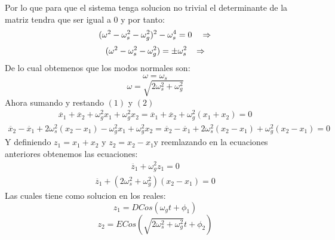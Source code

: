 \documentclass[a4paper]{article}
\begin{document}
\begin{answer}
\begin{enumerate}
    Por lo que para que el sistema tenga solucion no trivial el determinante de la matriz tendra que ser igual a $0$ y por tanto:
    $$(\omega^2 - \omega_s^2 -\omega_g^2)^2 - \omega_s^4 = 0 \hspace{0.35cm} \Rightarrow$$
    $$(\omega^2 - \omega_s^2 -\omega_g^2)  = \pm\omega_s^2  \hspace{0.3cm} \Rightarrow$$
    De lo cual obtemenos que los modos normales son:
    \begin{equation}
        \omega = \omega_s
    \end{equation}
     \begin{equation}
        \omega = \sqrt{ 2\omega_s^2 +\omega_g^2}
    \end{equation}
     Ahora sumando y restando  $(1)$ y $(2)$
       \begin{equation}
        \begin{split}
            \ddot{x_1} + \ddot{x_2}  + \omega_g^2 x_1 +\omega_g^2 x_2  = \ddot{x_1} + \ddot{x_2} + \omega_g^2(x_1 + x_2) = 0
        \end{split}
    \end{equation}
      \begin{equation}
        \begin{split}
            \ddot{x_2} - \ddot{x_1} + 2\omega_s^2(x_2 - x_1) - \omega_g^2 x_1 +\omega_g^2 x_2  =\ddot{x_2} - \ddot{x_1} + 2\omega_s^2(x_2 - x_1) + \omega_g^2 (x_2 -x_1)  = 0
        \end{split}
    \end{equation}
    Y definiendo $z_1 = x_1 + x_2 $ y $z_2 = x_2 -x_1$y reemlazando en la ecuaciones anteriores obtenemos las ecuaciones:
     \begin{equation}
        \begin{split}
           \ddot{z_1} + \omega_g^2z_1 = 0
        \end{split}
    \end{equation}
      \begin{equation}
        \begin{split}
            \ddot{z_1} + (2\omega_s^2 + \omega_g^2) (x_2 -x_1)  = 0
        \end{split}
    \end{equation}
    Las cuales tiene como solucion en los reales:
    \begin{equation}
        z_1 = DCos(\omega_g t + \phi_1)
    \end{equation}
    \begin{equation}
        z_2 = ECos(\sqrt{2\omega_s^2 + \omega_g^2} t + \phi_2)
    \end{equation}
    

\end{enumerate}
\end{answer}
\end{document}
